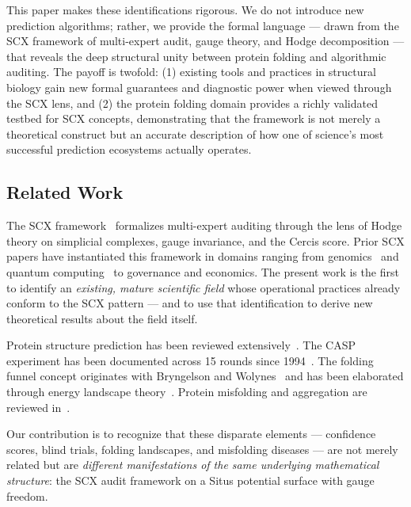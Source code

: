 \documentclass[12pt,a4paper]{article}
\theoremstyle{remark}
\begin{document}
This paper makes these identifications rigorous.
We do not introduce new prediction algorithms; rather, we provide the formal language — drawn from the SCX framework of multi-expert audit, gauge theory, and Hodge decomposition — that reveals the deep structural unity between protein folding and algorithmic auditing.
The payoff is twofold: (1) existing tools and practices in structural biology gain new formal guarantees and diagnostic power when viewed through the SCX lens, and (2) the protein folding domain provides a richly validated testbed for SCX concepts, demonstrating that the framework is not merely a theoretical construct but an accurate description of how one of science's most successful prediction ecosystems actually operates.

\subsection{Related Work}

The SCX framework~\cite{scxframework} formalizes multi-expert auditing through the lens of Hodge theory on simplicial complexes, gauge invariance, and the Cercis score.
Prior SCX papers have instantiated this framework in domains ranging from genomics~\cite{scxgenomics} and quantum computing~\cite{scxquantum} to governance and economics.
The present work is the first to identify an \emph{existing, mature scientific field} whose operational practices already conform to the SCX pattern — and to use that identification to derive new theoretical results about the field itself.

Protein structure prediction has been reviewed extensively~\cite{jumper2021highly, baek2021accurate, abramson2024accurate, wu2022high, lin2023evolutionary}.
The CASP experiment has been documented across 15 rounds since 1994~\cite{moult1995large, kryshtafovych2023critical}.
The folding funnel concept originates with Bryngelson and Wolynes~\cite{bryngelson1995funnels} and has been elaborated through energy landscape theory~\cite{wolynes2012energy}.
Protein misfolding and aggregation are reviewed in~\cite{chiti2017protein, knowles2014amyloid, dobson2017protein}.

Our contribution is to recognize that these disparate elements — confidence scores, blind trials, folding landscapes, and misfolding diseases — are not merely related but are \emph{different manifestations of the same underlying mathematical structure}: the SCX audit framework on a Situs potential surface with gauge freedom.
\end{document}
